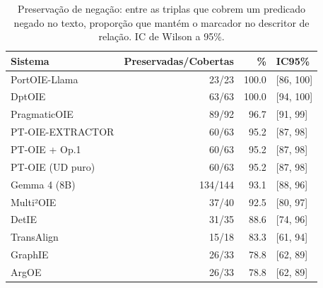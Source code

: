 \begin{table}[t]
\centering
\small
\caption{Preserva\c{c}\~ao de negação: entre as triplas que cobrem um predicado negado no texto, propor\c{c}\~ao que mant\'em o marcador no descritor de rela\c{c}\~ao. IC de Wilson a 95\%.}
\label{tab:polarity}
\begin{tabular}{l r r l}
\toprule
Sistema & Preservadas/Cobertas & \% & IC95\% \\
\midrule
PortOIE-Llama & 23/23 & 100.0 & [86, 100] \\
DptOIE & 63/63 & 100.0 & [94, 100] \\
PragmaticOIE & 89/92 & 96.7 & [91, 99] \\
PT-OIE-EXTRACTOR & 60/63 & 95.2 & [87, 98] \\
PT-OIE + Op.1 & 60/63 & 95.2 & [87, 98] \\
PT-OIE (UD puro) & 60/63 & 95.2 & [87, 98] \\
Gemma 4 (8B) & 134/144 & 93.1 & [88, 96] \\
Multi²OIE & 37/40 & 92.5 & [80, 97] \\
DetIE & 31/35 & 88.6 & [74, 96] \\
TransAlign & 15/18 & 83.3 & [61, 94] \\
GraphIE & 26/33 & 78.8 & [62, 89] \\
ArgOE & 26/33 & 78.8 & [62, 89] \\
\bottomrule
\end{tabular}
\end{table}
